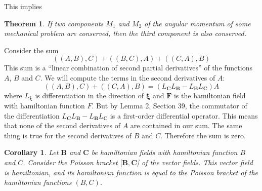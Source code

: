 \documentclass{book}
\numberwithin{equation}{section}
\theoremstyle{plain}
\newtheorem{cor}{Corollary}
\newtheorem*{thm*}{Theorem}
\let\oldendproof\endproof
\renewenvironment{proof}[1][\proofname]{%
  \oldproof[\textsc{#1}]%
}{\oldendproof}
\theoremstyle{definition}
\theoremstyle{remark}
\theoremstyle{smallcap}
\numberwithin{prob}{section}
\begin{document}
This implies

{\small
\begin{thm*}
  If two components $M_1$ and $M_2$ of the angular momentum
  of some mechanical problem are conserved,
  then the third component is also conserved.
\end{thm*}
}

\begin{proof}[Proof of the Jacobi identity]
  Consider the sum
  $$
  ((A, B), C) + ((B, C), A) + ((C, A), B)
  $$
  This sum is a ``linear combination of second partial derivatives''
  of the functions $A$, $B$ and $C$.
  We will compute the terms in the second derivatives of $A$:
  $$
  ((A, B), C) + ((C, A), B)
  =
  (L_\mathbf{C} L_\mathbf{B} - L_\mathbf{B} L_\mathbf{C}) A
  $$
  where $L_{\pmb\xi}$ is differentiation in the direction of $\pmb\xi$
  and $\mathbf F$ is the hamiltonian field with hamiltonian function $F$.
  But by Lemma 2, Section 39,
  the commutator of the differentiation
  $L_\mathbf{C} L_\mathbf{B} - L_\mathbf{B} L_\mathbf{C}$
  is a first-order differential operator.
  This means that none of the second derivatives of $A$
  are contained in our sum.
  The same thing is true for the second derivatives of $B$ and $C$.
  Therefore the sum is zero.
\end{proof}

\begin{cor}
  Let $\mathbf B$ and $\mathbf C$ be hamiltonian fields
  with hamiltonian function $B$ and $C$.
  Consider the Poisson bracket $[\mathbf B, \mathbf C$]
  of the vector fields.
  This vector field is hamiltonian,
  and its hamiltonian function is equal to the Poisson bracket
  of the hamiltonian functions $(B, C)$.
\end{cor}
\end{document}
